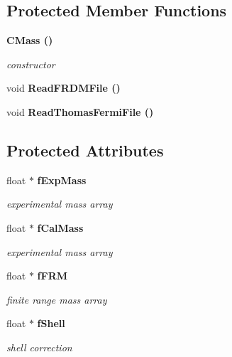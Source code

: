 \subsection*{Protected Member Functions}
\begin{CompactItemize}
\item 
\bf{CMass} ()
\begin{CompactList}\small\item\em constructor \item\end{CompactList}\item 
void \bf{Read\-FRDMFile} ()
\item 
void \bf{Read\-Thomas\-Fermi\-File} ()
\end{CompactItemize}
\subsection*{Protected Attributes}
\begin{CompactItemize}
\item 
float $\ast$ \bf{f\-Exp\-Mass}\label{classCMass_94b681f2a0949f6e3abbcb1872e3569a}

\begin{CompactList}\small\item\em experimental mass array \item\end{CompactList}\item 
float $\ast$ \bf{f\-Cal\-Mass}\label{classCMass_d1d4e9cfdd75aa6a361ab4131a9e3250}

\begin{CompactList}\small\item\em experimental mass array \item\end{CompactList}\item 
float $\ast$ \bf{f\-FRM}\label{classCMass_b664f2eba3bb5973a5f3a41c5a929f94}

\begin{CompactList}\small\item\em finite range mass array \item\end{CompactList}\item 
float $\ast$ \bf{f\-Shell}\label{classCMass_b22cbf6a40128e4aa1460b9469e1ab8b}

\begin{CompactList}\small\item\em shell correction \item\end{CompactList}\end{CompactItemize}
